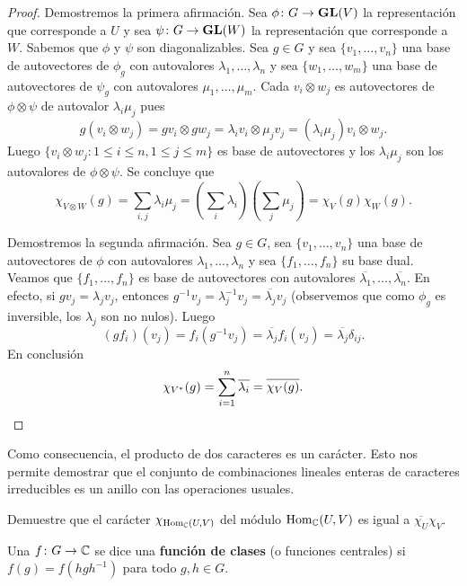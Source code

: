 \begin{proof}
	Demostremos la primera afirmación. Sea $\phi\colon G\to\mathbf{GL}(V)$ la representación que corresponde a $U$ y sea 
	$\psi\colon G\to\mathbf{GL}(W)$ la representación que corresponde a $W$.  
	Sabemos que $\phi$ y $\psi$ son diagonalizables. Sea $g\in G$ y sea $\{v_1,\dots,v_n\}$
	una base de autovectores de $\phi_g$ con autovalores
	$\lambda_1,\dots,\lambda_n$ y sea $\{w_1,\dots,w_m\}$ una base de
	autovectores de $\psi_g$ con autovalores $\mu_1,\dots,\mu_m$. Cada
	$v_i\otimes w_j$ es autovectores de $\phi\otimes\psi$ de autovalor
	$\lambda_i\mu_j$ pues 
	\[
		g(v_i\otimes w_j)=gv_i\otimes gw_j=\lambda_iv_i\otimes \mu_jv_j=(\lambda_i\mu_j)v_i\otimes w_j.
	\]
	Luego 
	$\{v_i\otimes w_j:1\leq i\leq n,1\leq j\leq m\}$ es base de autovectores y
	los $\lambda_i\mu_j$ son los autovalores de $\phi\otimes\psi$. Se concluye que
	\[
	\chi_{V\otimes W}(g)=\sum_{i,j}\lambda_i\mu_j=(\sum_i\lambda_i)(\sum_j\mu_j)=\chi_V(g)\chi_W(g).
	\]

	Demostremos la segunda afirmación. Sea $g\in G$, sea $\{v_1,\dots,v_n\}$
	una base de autovectores de $\phi$ con autovalores
	$\lambda_1,\dots,\lambda_n$ y sea $\{f_1,\dots,f_n\}$ su base dual. Veamos que $\{f_1,\dots,f_n\}$ es base de autovectores
	con autovalores $\overline{\lambda_1},\dots,\overline{\lambda_n}$. En efecto, si $gv_j=\lambda_jv_j$, entonces
	$g^{-1}v_j=\lambda_j^{-1}v_j=\overline{\lambda_j}v_j$ (observemos que como $\phi_g$ es inversible, los $\lambda_j$ son no nulos). Luego
	\[
		(gf_i)(v_j)=f_i(g^{-1}v_j)=\overline{\lambda_j}f_i(v_j)=\overline{\lambda_j}\delta_{ij}.
	\]
	En conclusión
	\[
		\chi_{V^*}(g)=\sum_{i=1}^n\overline{\lambda_i}=\overline{\chi_V(g)}.\qedhere
	\]
\end{proof}

Como consecuencia, el producto de dos caracteres es un carácter. 
Esto nos permite demostrar que 
el conjunto de combinaciones lineales enteras de caracteres 
irreducibles es un anillo con las operaciones usuales. 

\begin{exercise}
	Demuestre que el carácter $\chi_{\operatorname{Hom}_{\mathbb{C}}(U,V)}$ del módulo $\operatorname{Hom}_{\mathbb{C}}(U,V)$ es igual a
	$\overline{\chi_U}\chi_V$.
\end{exercise}

\begin{definition}
  \label{exercise:cf(G)}
  Una $f\colon G\to\mathbb{C}$ se dice una \textbf{función de clases} (o funciones centrales) si
  $f(g)=f(hgh^{-1})$ para todo $g,h\in G$.  
\end{definition}

